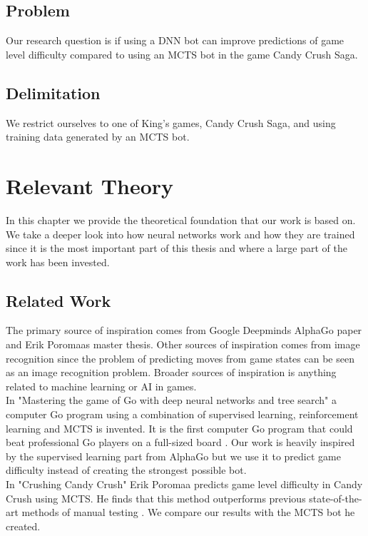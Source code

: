 \documentclass{kththesis}
\begin{document}
\section{Problem}
Our research question is if using a DNN bot can improve predictions of game level difficulty compared to using an MCTS bot in the game Candy Crush Saga.

\section{Delimitation}
We restrict ourselves to one of King's games, Candy Crush Saga, and using training data generated by an MCTS bot.

\chapter{Relevant Theory}
In this chapter we provide the  theoretical foundation that our work is based on. We take a deeper look into how neural networks work and how they are trained since it is the most important part of this thesis and where a large part of the work has been invested.

\section{Related Work}
The primary source of inspiration comes from  Google Deepminds AlphaGo paper and Erik Poromaas master thesis. Other sources of inspiration comes from image recognition since the problem of predicting moves from game states can be seen as an image recognition problem. Broader sources of inspiration is anything related to machine learning or AI in games.\\

In "Mastering the game of Go with deep neural networks and tree search" a computer Go program using a combination of supervised learning, reinforcement learning and MCTS is invented. It is the first computer Go program that could beat professional Go players on a full-sized board \cite{alphaGo2016}. Our work is heavily inspired by the supervised learning part from AlphaGo but we use it to predict game difficulty instead of creating the strongest possible bot. \\

In "Crushing Candy Crush" Erik Poromaa predicts game level difficulty in Candy Crush using MCTS. He finds that this method outperforms previous state-of-the-art methods of manual testing \cite{poromaa2016}. We compare our results with the MCTS bot he created. \\
\end{document}
